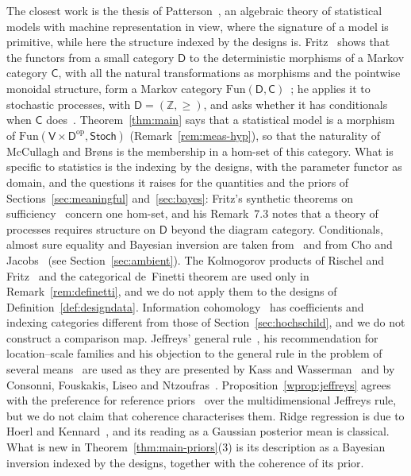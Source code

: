 \documentclass[11pt,a4paper]{article}
\theoremstyle{plain}
\theoremstyle{definition}
\theoremstyle{remark}
\newcommand{\cat}[1]{\mathsf{#1}}
\newcommand{\catV}{\cat{V}}
\newcommand{\catD}{\cat{D}}
\newcommand{\Stoch}{\cat{Stoch}}
\newcommand{\op}{\mathrm{op}}
\begin{document}
The closest work is the thesis of Patterson~\cite{patterson_algebra_2020}, an
algebraic theory of statistical models with machine representation in view,
where the signature of a model is primitive, while here the structure indexed
by the designs is. Fritz~\cite[\S7]{fritz_synthetic_2020} shows that the
functors from a small category $\catD$ to the deterministic morphisms of a
Markov category $\cat{C}$, with all the natural transformations as morphisms
and the pointwise monoidal structure, form a Markov category
$\mathrm{Fun}(\catD,\cat{C})$~\cite[Prop.~7.1]{fritz_synthetic_2020}; he
applies it to stochastic processes, with $\catD = (\mathbb{Z},\ge)$, and asks
whether it has conditionals when $\cat{C}$
does~\cite[Problem~11.9]{fritz_synthetic_2020}. Theorem~\ref{thm:main} says
that a statistical model is a morphism of
$\mathrm{Fun}(\catV\times\catD^{\op},\Stoch)$ (Remark~\ref{rem:meas-hyp}), so
that the naturality of McCullagh and Br\o ns is the membership in a hom-set of
this category. What is specific to statistics is the indexing by the designs,
with the parameter functor as domain, and the questions it raises for the
quantities and the priors of Sections~\ref{sec:meaningful}
and~\ref{sec:bayes}: Fritz's synthetic theorems on
sufficiency~\cite[Def.~14.1]{fritz_synthetic_2020} concern one hom-set, and
his Remark~7.3 notes that a theory of processes requires structure on $\catD$
beyond the diagram category.
Conditionals, almost sure equality and Bayesian inversion are taken
from~\cite{fritz_synthetic_2020} and from Cho and
Jacobs~\cite{cho_disintegration_2019} (see Section~\ref{sec:ambient}). The
Kolmogorov products of Rischel and Fritz~\cite{fritz_rischel_infinite_2020}
and the categorical de~Finetti theorem are used only in
Remark~\ref{rem:definetti}, and we do not apply them to the designs of
Definition~\ref{def:designdata}. Information
cohomology~\cite{baudot_homological_2015,vigneaux_information_2021} has
coefficients and indexing categories different from those of
Section~\ref{sec:hochschild}, and we do not construct a comparison map.
Jeffreys' general rule~\cite{jeffreys_invariant_1946}, his recommendation for
location--scale families and his objection to the general rule in the problem
of several means~\cite{jeffreys_theory_1961} are used as they are presented by
Kass and Wasserman~\cite{kass_selection_1996} and by Consonni, Fouskakis, Liseo
and Ntzoufras~\cite{consonni_prior_2018}. Proposition~\ref{wprop:jeffreys}
agrees with the preference for reference
priors~\cite{bernardo_reference_1979,berger_formal_2009} over the
multidimensional Jeffreys rule, but we do not claim that coherence
characterises them. Ridge regression is due to Hoerl and
Kennard~\cite{hoerl_ridge_1970}, and its reading as a Gaussian posterior mean
is classical. What is new in Theorem~\ref{thm:main-priors}(3) is its
description as a Bayesian inversion indexed by the designs, together with the
coherence of its prior.
\end{document}
